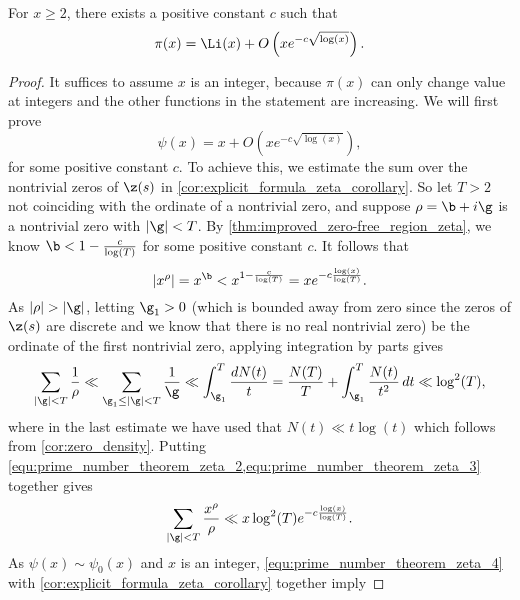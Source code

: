    \begin{theorem}
      For $x \ge 2$, there exists a positive constant $c$ such that
      \[
        \pi(x) = \Li(x)+O\left(xe^{-c\sqrt{\log(x)}}\right).
      \]
    \end{theorem}
    \begin{proof}
      It suffices to assume $x$ is an integer, because $\pi(x)$ can only change value at integers and the other functions in the statement are increasing. We will first prove
      \begin{equation}\label{equ:prime_number_theorem_zeta_1}
        \psi(x) = x+O\left(xe^{-c\sqrt{\log(x)}}\right),
      \end{equation}
      for some positive constant $c$. To achieve this, we estimate the sum over the nontrivial zeros of $\z(s)$ in \cref{cor:explicit_formula_zeta_corollary}. So let $T > 2$ not coinciding with the ordinate of a nontrivial zero, and suppose $\rho = \b+i\g$ is a nontrivial zero with $|\g| < T$. By \cref{thm:improved_zero-free_region_zeta}, we know $\b < 1-\frac{c}{\log(T)}$ for some positive constant $c$. It follows that
      \begin{equation}\label{equ:prime_number_theorem_zeta_2}
        |x^{\rho}| = x^{\b} < x^{1-\frac{c}{\log(T)}} = xe^{-c\frac{\log(x)}{\log(T)}}.
      \end{equation}
      As $|\rho| > |\g|$, letting $\g_{1} > 0$ (which is bounded away from zero since the zeros of $\z(s)$ are discrete and we know that there is no real nontrivial zero) be the ordinate of the first nontrivial zero, applying integration by parts gives
      \begin{equation}\label{equ:prime_number_theorem_zeta_3}
        \sum_{|\g| < T}\frac{1}{\rho} \ll \sum_{\g_{1} \le |\g| < T}\frac{1}{\g} \ll \int_{\g_{1}}^{T}\frac{dN(t)}{t} = \frac{N(T)}{T}+\int_{\g_{1}}^{T}\frac{N(t)}{t^{2}}\,dt \ll \log^{2}(T),
      \end{equation}
      where in the last estimate we have used that $N(t) \ll t\log(t)$ which follows from \cref{cor:zero_density}. Putting \cref{equ:prime_number_theorem_zeta_2,equ:prime_number_theorem_zeta_3} together gives
      \begin{equation}\label{equ:prime_number_theorem_zeta_4}
        \sum_{|\g| < T}\frac{x^{\rho}}{\rho} \ll x\log^{2}(T)e^{-c\frac{\log(x)}{\log(T)}}.
      \end{equation}
      As $\psi(x) \sim \psi_{0}(x)$ and $x$ is an integer, \cref{equ:prime_number_theorem_zeta_4} with \cref{cor:explicit_formula_zeta_corollary} together imply

\end{proof}
